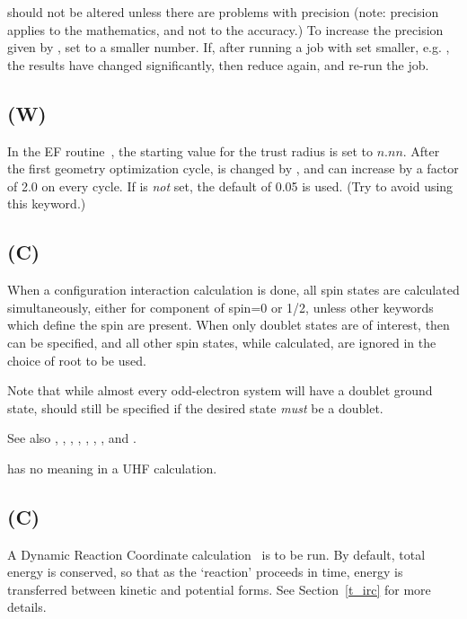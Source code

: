  should not be altered unless there are problems with  precision
(note: precision applies to the mathematics, and not to the   accuracy.)  To
increase the precision given by , set   to a smaller
number.   If, after running a job with  set smaller,  e.g.
, the results have changed significantly, then reduce
 again, and re-run the job.



\subsection*{ (W)}
In the EF routine~\cite{ef-ts},  the  starting value for the trust
radius is set to $n.nn$.   After the first geometry optimization cycle,
 is changed by  , and can increase by a factor of 2.0
on every cycle.
If  is {\em not} set, the default of 0.05  is used.
(Try to avoid using this keyword.)

\subsection*{ (C)}
When a configuration  interaction  calculation  is  done,  all  spin states are
calculated simultaneously, either for component of spin=0 or 1/2, unless other
keywords which define the spin are present.   When only doublet states are  of
interest,  then    can  be specified,  and  all  other spin
states, while calculated, are ignored in the choice of root to be used.

Note that while almost every odd-electron system will have a doublet ground
state,  should still be specified if the desired state {\em must}
be a doublet.

See also , , , ,
, ,  , and .

 has no meaning in a UHF calculation.

\subsection*{ (C)}
A Dynamic Reaction Coordinate calculation~\cite{drc} is to be run.  By default,
total  energy  is  conserved, so that as the `reaction' proceeds in time,
energy is transferred between kinetic and potential forms. See
Section~\ref{t_irc} for more details.

